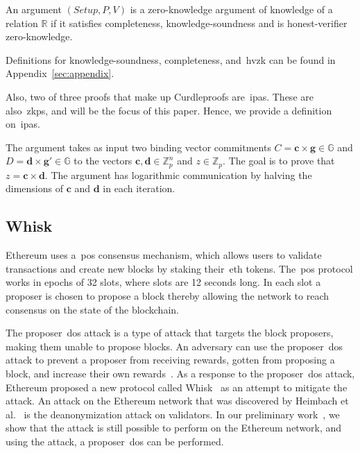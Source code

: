 \begin{definition}
    An argument $(Setup, P, V)$ is a zero-knowledge argument of knowledge of a relation $\mathbb{R}$ if it satisfies completeness, knowledge-soundness and is honest-verifier zero-knowledge.
\end{definition}

Definitions for knowledge-soundness, completeness, and~\gls{hvzk} can be found in Appendix~\ref{sec:appendix}.

Also, two of three proofs that make up Curdleproofs are~\glspl{ipa}.
These are also~\glspl{zkp}, and will be the focus of this paper.
Hence, we provide a definition on~\glspl{ipa}.

\begin{definition}
    The argument takes as input two binding vector commitments $C=\mathbf{c}\times\mathbf{g}\in\mathbb{G}$ and $D=\mathbf{d}\times\mathbf{g'}\in\mathbb{G}$ to the vectors $\mathbf{c},\mathbf{d}\in\mathbb{Z}_p^n$ and $z\in\mathbb{Z}_p$.
    The goal is to prove that $z=\mathbf{c}\times\mathbf{d}$.
    The argument has logarithmic communication by halving the dimensions of $\mathbf{c}$ and $\mathbf{d}$ in each iteration.
\end{definition}

\subsection{Whisk}\label{subsec:related-work-whisk}
Ethereum uses a~\gls{pos} consensus mechanism, which allows users to validate transactions and create new blocks by staking their~\gls{eth} tokens.
The~\gls{pos} protocol works in epochs of 32 slots, where slots are 12 seconds long.
In each slot a proposer is chosen to propose a block thereby allowing the network to reach consensus on the state of the blockchain.

The proposer~\gls{dos} attack is a type of attack that targets the block proposers, making them unable to propose blocks.
An adversary can use the proposer~\gls{dos} attack to prevent a proposer from receiving rewards, gotten from proposing a block, and increase their own rewards~\cite{EthereumSSLE2024}.
As a response to the proposer~\gls{dos} attack, Ethereum proposed a new protocol called Whisk~\cite{Whisk2024} as an attempt to mitigate the attack.
An attack on the Ethereum network that was discovered by Heimbach et al.~\cite{heimbach2024deanonymizingethereumvalidatorsp2p} is the deanonymization attack on validators.
In our preliminary work~\cite{ouroldpaper}, we show that the attack is still possible to perform on the Ethereum network, and using the attack, a proposer~\gls{dos} can be performed.


